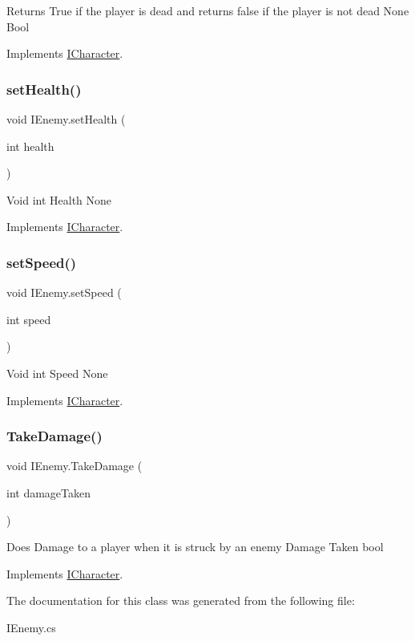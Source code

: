 Returns True if the player is dead and returns false if the player is not dead  None  Bool 

Implements \mbox{\hyperlink{interface_i_character}{I\+Character}}.

\mbox{\label{class_i_enemy_aa8f554e318bad0827c6186e6ae46fbd4}} 
\subsubsection{\texorpdfstring{set\+Health()}{setHealth()}}
{\footnotesize\ttfamily void I\+Enemy.\+set\+Health (\begin{DoxyParamCaption}\item[{int}]{health }\end{DoxyParamCaption})\hspace{0.3cm}{\ttfamily [inline]}}

Void  int Health  None 

Implements \mbox{\hyperlink{interface_i_character}{I\+Character}}.

\mbox{\label{class_i_enemy_aef93bc3d389f8b290b0eb4f12dc329f4}} 
\subsubsection{\texorpdfstring{set\+Speed()}{setSpeed()}}
{\footnotesize\ttfamily void I\+Enemy.\+set\+Speed (\begin{DoxyParamCaption}\item[{int}]{speed }\end{DoxyParamCaption})\hspace{0.3cm}{\ttfamily [inline]}}

Void  int Speed  None 

Implements \mbox{\hyperlink{interface_i_character}{I\+Character}}.

\mbox{\label{class_i_enemy_af9c3000cf4db4888aa1be7e6db70240f}} 
\subsubsection{\texorpdfstring{Take\+Damage()}{TakeDamage()}}
{\footnotesize\ttfamily void I\+Enemy.\+Take\+Damage (\begin{DoxyParamCaption}\item[{int}]{damage\+Taken }\end{DoxyParamCaption})\hspace{0.3cm}{\ttfamily [inline]}}

Does Damage to a player when it is struck by an enemy  Damage Taken  bool 

Implements \mbox{\hyperlink{interface_i_character}{I\+Character}}.



The documentation for this class was generated from the following file\+:\begin{DoxyCompactItemize}
\item 
I\+Enemy.\+cs\end{DoxyCompactItemize}
